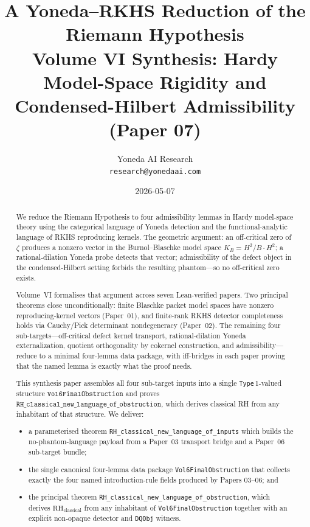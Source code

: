 \documentclass[11pt]{article}
\title{A Yoneda--RKHS Reduction of the Riemann Hypothesis \\
       \large Volume VI Synthesis: Hardy Model-Space Rigidity and Condensed-Hilbert Admissibility \\
       \large (Paper 07)}
\author{Yoneda AI Research \\
        \texttt{research@yonedaai.com}}
\date{2026-05-07}
\theoremstyle{plain}
\theoremstyle{definition}
\theoremstyle{remark}
\newcommand{\code}[1]{\texttt{#1}}
\newcommand{\RH}{\mathrm{RH}_{\mathrm{classical}}}
\begin{document}
\maketitle

\begin{abstract}
We reduce the Riemann Hypothesis to four admissibility lemmas in Hardy
model-space theory using the categorical language of Yoneda detection
and the functional-analytic language of RKHS reproducing kernels. The
geometric argument: an off-critical zero of \(\zeta\) produces a
nonzero vector in the Burnol--Blaschke model space
\(K_B = H^2 / B \cdot H^2\); a rational-dilation Yoneda probe detects
that vector; admissibility of the defect object in the
condensed-Hilbert setting forbids the resulting phantom---so no
off-critical zero exists.

Volume~VI formalises that argument across seven Lean-verified papers.
Two principal theorems close unconditionally: finite Blaschke packet
model spaces have nonzero reproducing-kernel vectors (Paper~01), and
finite-rank RKHS detector completeness holds via Cauchy/Pick
determinant nondegeneracy (Paper~02).  The remaining four
sub-targets---off-critical defect kernel transport, rational-dilation
Yoneda externalization, quotient orthogonality by cokernel
construction, and admissibility---reduce to a minimal four-lemma data
package, with iff-bridges in each paper proving that the named lemma
is exactly what the proof needs.

This synthesis paper assembles all four sub-target inputs into a
single \code{Type}\,1-valued structure
\(\code{Vol6FinalObstruction}\) and proves
\(\code{RH\_classical\_new\_language\_of\_obstruction}\), which derives
classical RH from any inhabitant of that structure.  We deliver:

\begin{itemize}[leftmargin=2em]
  \item a parameterised theorem
        \code{RH\_classical\_new\_language\_of\_inputs} which builds the
        no-phantom-language payload from a Paper~03 transport bridge
        and a Paper~06 sub-target bundle;
  \item the single canonical four-lemma data package
        \code{Vol6FinalObstruction} that collects exactly the four
        named introduction-rule fields produced by Papers 03--06; and
  \item the principal theorem
        \code{RH\_classical\_new\_language\_of\_obstruction}, which
        derives \(\RH\) from any inhabitant of
        \code{Vol6FinalObstruction} together with an explicit
        non-opaque detector and \code{DQObj} witness.
\end{itemize}


\end{abstract}
\end{document}
